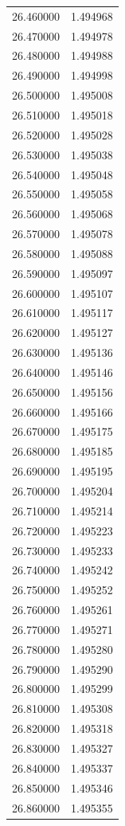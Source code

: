 \begin{tabular}{rr}
26.460000 & 1.494968 \\
26.470000 & 1.494978 \\
26.480000 & 1.494988 \\
26.490000 & 1.494998 \\
26.500000 & 1.495008 \\
26.510000 & 1.495018 \\
26.520000 & 1.495028 \\
26.530000 & 1.495038 \\
26.540000 & 1.495048 \\
26.550000 & 1.495058 \\
26.560000 & 1.495068 \\
26.570000 & 1.495078 \\
26.580000 & 1.495088 \\
26.590000 & 1.495097 \\
26.600000 & 1.495107 \\
26.610000 & 1.495117 \\
26.620000 & 1.495127 \\
26.630000 & 1.495136 \\
26.640000 & 1.495146 \\
26.650000 & 1.495156 \\
26.660000 & 1.495166 \\
26.670000 & 1.495175 \\
26.680000 & 1.495185 \\
26.690000 & 1.495195 \\
26.700000 & 1.495204 \\
26.710000 & 1.495214 \\
26.720000 & 1.495223 \\
26.730000 & 1.495233 \\
26.740000 & 1.495242 \\
26.750000 & 1.495252 \\
26.760000 & 1.495261 \\
26.770000 & 1.495271 \\
26.780000 & 1.495280 \\
26.790000 & 1.495290 \\
26.800000 & 1.495299 \\
26.810000 & 1.495308 \\
26.820000 & 1.495318 \\
26.830000 & 1.495327 \\
26.840000 & 1.495337 \\
26.850000 & 1.495346 \\
26.860000 & 1.495355 \\

\end{tabular}
